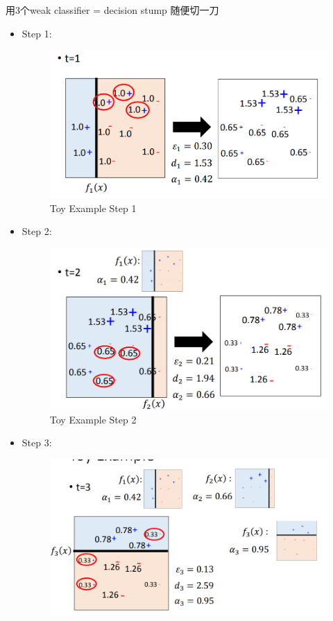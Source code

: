 用3个weak classifier = decision stump 随便切一刀
\begin{itemize}
    \item Step 1:
    \\
    \begin{figure}[H]
        \centerline{\includegraphics[scale=0.3]{Part1/Chapter/images/toyexample1.png}}
        \caption{Toy Example Step 1}
    \end{figure}
    \item Step 2:
    \\
    \begin{figure}[H]
        \centerline{\includegraphics[scale=0.3]{Part1/Chapter/images/toyexample2.png}}
        \caption{Toy Example Step 2}
    \end{figure}
    \item Step 3:
    \\
    \begin{figure}[H]
        \centerline{\includegraphics[scale=0.3]{Part1/Chapter/images/toyexample3.png}}

\end{figure}
\end{itemize}
